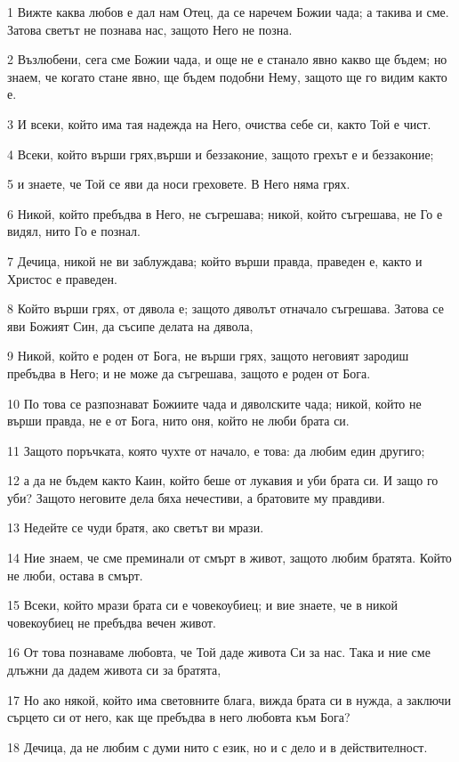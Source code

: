 \par 1 Вижте каква любов е дал нам Отец, да се наречем Божии чада; а такива и сме. Затова светът не познава нас, защото Него не позна.
\par 2 Възлюбени, сега сме Божии чада, и още не е станало явно какво ще бъдем; но знаем, че когато стане явно, ще бъдем подобни Нему, защото ще го видим както е.
\par 3 И всеки, който има тая надежда на Него, очиства себе си, както Той е чист.
\par 4 Всеки, който върши грях,върши и беззаконие, защото грехът е и беззаконие;
\par 5 и знаете, че Той се яви да носи греховете. В Него няма грях.
\par 6 Никой, който пребъдва в Него, не съгрешава; никой, който съгрешава, не Го е видял, нито Го е познал.
\par 7 Дечица, никой не ви заблуждава; който върши правда, праведен е, както и Христос е праведен.
\par 8 Който върши грях, от дявола е; защото дяволът отначало съгрешава. Затова се яви Божият Син, да съсипе делата на дявола,
\par 9 Никой, който е роден от Бога, не върши грях, защото неговият зародиш пребъдва в Него; и не може да съгрешава, защото е роден от Бога.
\par 10 По това се разпознават Божиите чада и дяволските чада; никой, който не върши правда, не е от Бога, нито оня, който не люби брата си.
\par 11 Защото поръчката, която чухте от начало, е това: да любим един другиго;
\par 12 а да не бъдем както Каин, който беше от лукавия и уби брата си. И защо го уби? Защото неговите дела бяха нечестиви, а братовите му правдиви.
\par 13 Недейте се чуди братя, ако светът ви мрази.
\par 14 Ние знаем, че сме преминали от смърт в живот, защото любим братята. Който не люби, остава в смърт.
\par 15 Всеки, който мрази брата си е човекоубиец; и вие знаете, че в никой човекоубиец не пребъдва вечен живот.
\par 16 От това познаваме любовта, че Той даде живота Си за нас. Така и ние сме длъжни да дадем живота си за братята,
\par 17 Но ако някой, който има световните блага, вижда брата си в нужда, а заключи сърцето си от него, как ще пребъдва в него любовта към Бога?
\par 18 Дечица, да не любим с думи нито с език, но и с дело и в действителност.

